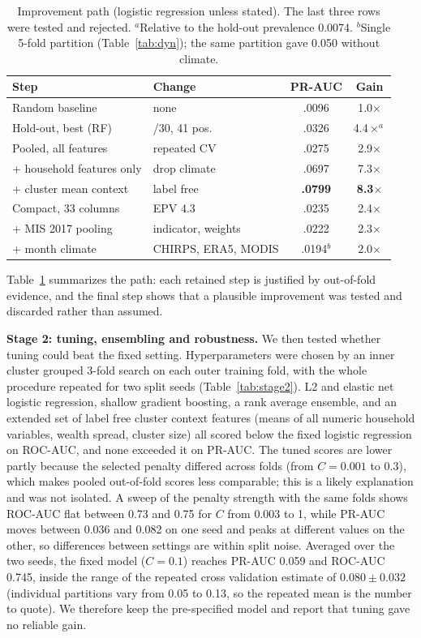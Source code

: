 \documentclass[11pt]{article}
\begin{document}
\begin{table}[t]
\centering\footnotesize\setlength{\tabcolsep}{3pt}
\begin{tabular}{>{\raggedright\arraybackslash}p{2.5cm}>{\raggedright\arraybackslash}p{2.3cm}cc}
\toprule
Step & Change & PR-AUC & Gain\\
\midrule
Random baseline & none & .0096 & 1.0$\times$\\
Hold-out, best (RF) & 70/30, 41 pos. & .0326 & 4.4$\times^{a}$\\
Pooled, all features & repeated CV & .0275 & 2.9$\times$\\
+ household features only & drop climate & .0697 & 7.3$\times$\\
+ cluster mean context & label free & \textbf{.0799} & \textbf{8.3$\times$}\\
Compact, 33 columns & EPV 4.3 & .0235 & 2.4$\times$\\
+ MIS 2017 pooling & indicator, weights & .0222 & 2.3$\times$\\
+ month climate & CHIRPS, ERA5, MODIS & .0194$^{b}$ & 2.0$\times$\\
\bottomrule
\end{tabular}
\caption{Improvement path (logistic regression unless stated). The last three rows were tested and rejected. $^{a}$Relative to the hold-out prevalence 0.0074. $^{b}$Single 5-fold partition (Table~\ref{tab:dyn}); the same partition gave 0.050 without climate.}
\label{tab:path}
\end{table}

Table~\ref{tab:path} summarizes the path: each retained step is justified by out-of-fold evidence, and the final step shows that a plausible improvement was tested and discarded rather than assumed.

\textbf{Stage 2: tuning, ensembling and robustness.} We then tested whether tuning could beat the fixed setting. Hyperparameters were chosen by an inner cluster grouped 3-fold search on each outer training fold, with the whole procedure repeated for two split seeds (Table~\ref{tab:stage2}). L2 and elastic net logistic regression, shallow gradient boosting, a rank average ensemble, and an extended set of label free cluster context features (means of all numeric household variables, wealth spread, cluster size) all scored below the fixed logistic regression on ROC-AUC, and none exceeded it on PR-AUC. The tuned scores are lower partly because the selected penalty differed across folds (from $C=0.001$ to $0.3$), which makes pooled out-of-fold scores less comparable; this is a likely explanation and was not isolated. A sweep of the penalty strength with the same folds shows ROC-AUC flat between 0.73 and 0.75 for $C$ from 0.003 to 1, while PR-AUC moves between 0.036 and 0.082 on one seed and peaks at different values on the other, so differences between settings are within split noise. Averaged over the two seeds, the fixed model ($C=0.1$) reaches PR-AUC 0.059 and ROC-AUC 0.745, inside the range of the repeated cross validation estimate of $0.080\pm0.032$ (individual partitions vary from 0.05 to 0.13, so the repeated mean is the number to quote). We therefore keep the pre-specified model and report that tuning gave no reliable gain.
\end{document}
